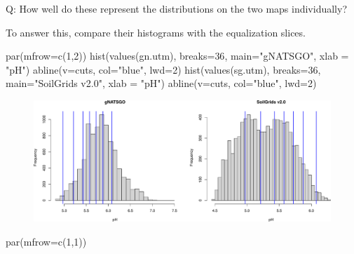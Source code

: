 \documentclass[
  letterpaper,
  DIV=11,
  numbers=noendperiod]{scrartcl}
\newenvironment{Shaded}{\begin{snugshade}}{\end{snugshade}}
\newcommand{\AttributeTok}[1]{\textcolor[rgb]{0.40,0.45,0.13}{#1}}
\newcommand{\DecValTok}[1]{\textcolor[rgb]{0.68,0.00,0.00}{#1}}
\newcommand{\FunctionTok}[1]{\textcolor[rgb]{0.28,0.35,0.67}{#1}}
\newcommand{\NormalTok}[1]{\textcolor[rgb]{0.00,0.23,0.31}{#1}}
\newcommand{\StringTok}[1]{\textcolor[rgb]{0.13,0.47,0.30}{#1}}
\begin{document}
Q: How well do these represent the distributions on the two maps
individually?

To answer this, compare their histograms with the equalization slices.

\begin{Shaded}
\begin{Highlighting}[]
\FunctionTok{par}\NormalTok{(}\AttributeTok{mfrow=}\FunctionTok{c}\NormalTok{(}\DecValTok{1}\NormalTok{,}\DecValTok{2}\NormalTok{))}
\FunctionTok{hist}\NormalTok{(}\FunctionTok{values}\NormalTok{(gn.utm), }\AttributeTok{breaks=}\DecValTok{36}\NormalTok{, }\AttributeTok{main=}\StringTok{"gNATSGO"}\NormalTok{,}
     \AttributeTok{xlab =} \StringTok{"pH"}\NormalTok{)}
\FunctionTok{abline}\NormalTok{(}\AttributeTok{v=}\NormalTok{cuts, }\AttributeTok{col=}\StringTok{"blue"}\NormalTok{, }\AttributeTok{lwd=}\DecValTok{2}\NormalTok{)}
\FunctionTok{hist}\NormalTok{(}\FunctionTok{values}\NormalTok{(sg.utm), }\AttributeTok{breaks=}\DecValTok{36}\NormalTok{, }\AttributeTok{main=}\StringTok{"SoilGrids v2.0"}\NormalTok{,}
     \AttributeTok{xlab =} \StringTok{"pH"}\NormalTok{)}
\FunctionTok{abline}\NormalTok{(}\AttributeTok{v=}\NormalTok{cuts, }\AttributeTok{col=}\StringTok{"blue"}\NormalTok{, }\AttributeTok{lwd=}\DecValTok{2}\NormalTok{)}
\end{Highlighting}
\end{Shaded}

\begin{figure}[H]

{\centering \includegraphics{PatternAnalysisWorkshopTutorial_files/figure-pdf/histo-equal-one-by-one-1.pdf}

}

\end{figure}

\begin{Shaded}
\begin{Highlighting}[]
\FunctionTok{par}\NormalTok{(}\AttributeTok{mfrow=}\FunctionTok{c}\NormalTok{(}\DecValTok{1}\NormalTok{,}\DecValTok{1}\NormalTok{))}
\end{Highlighting}
\end{Shaded}
\end{document}
